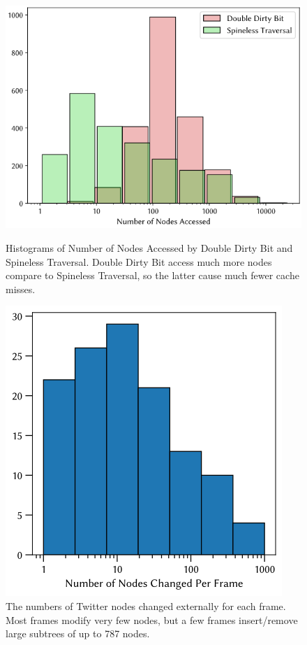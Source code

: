 \begin{figure}
\begin{minipage}{.56\linewidth}%
\includegraphics[width=\linewidth]{DBPQHist.png}%
\caption{Histograms of Number of Nodes Accessed by Double Dirty Bit and Spineless Traversal. Double Dirty Bit access much more nodes compare to Spineless Traversal, so the latter cause much fewer cache misses.}
\label{fig:nodes-accessed}
\end{minipage}\hfill%
\begin{minipage}{.42\linewidth}%
\includegraphics[width=\linewidth]{CaseStudy.png}
\caption{The numbers of Twitter nodes changed externally for each frame. Most frames modify very few nodes, but a few frames insert/remove large subtrees of up to 787 nodes.}
\label{fig:case-study}
\end{minipage}
\end{figure}

